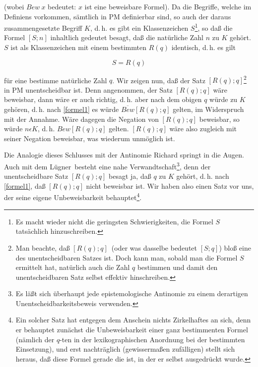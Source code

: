 \documentclass[draft]{scrartcl}
\begin{document}
(wobei $Bew\ x$ bedeutet: $x$ ist eine beweisbare Formel).
Da die Begriffe, welche im Definiens vorkommen, sämtlich
in PM definierbar sind, so auch der daraus zusammengesetzte
Begriff $K$, d.\,h. es gibt ein Klassenzeichen 
$S$\footnote{Es macht wieder nicht die geringsten Schwierigkeiten, die Formel $S$ tatsächlich hinzuschreiben.},
so daß die Formel $\left[S; n\right]$ inhaltlich gedeutet besagt,
daß die natürliche Zahl $n$ zu $K$ gehört. $S$ ist als
Klassenzeichen mit einem bestimmten $R\left(q\right)$ identisch, 
d.\,h. es gilt

$$ S = R\left(q\right) $$%

\noindent für eine bestimme natürliche Zahl $q$. Wir zeigen nun, daß
der Satz $\left[R\left(q\right); q\right]$\footnote{Man beachte, daß
\glqq$\left[R\left(q\right); q\right]$\grqq\ (oder was dasselbe bedeutet
\glqq$\left[S; q\right]$\grqq) bloß eine  
des unentscheidbaren Satzes ist. Doch kann man, sobald man die Formel 
$S$ ermittelt hat, natürlich auch die Zahl $q$ bestimmen und damit 
den unentscheidbaren Satz selbst effektiv hinschreiben.} 
in PM unentscheidbar ist. Denn angenommen, der Satz
$\left[R\left(q\right); q\right]$ wäre beweisbar, dann wäre er auch richtig,
d.\,h. aber nach dem obigen $q$ würde zu $K$ gehören,
d.\,h. nach \ref{formel1} es würde 
$\overline{Bew}\left[R\left(q\right); q\right]$ gelten, im Widerspruch mit der
Annahme. Wäre dagegen die Negation von
$\left[R\left(q\right); q\right]$ beweisbar, so würde $n \epsilon K$,
d.\,h. $Bew\left[R\left(q\right); q\right]$ gelten. $\left[R\left(q\right); q\right]$ wäre also 
zugleich mit seiner Negation beweisbar, was wiederum 
unmöglich ist.

Die Analogie dieses Schlusses mit der Antinomie Richard
springt in die Augen. Auch mit dem 
\glqq Lügner\grqq\ besteht eine nahe 
Verwandtschaft\footnote{Es läßt sich überhaupt jede epistemologische 
Antinomie zu einem derartigen Unentscheidbarkeitsbeweis verwenden.},
denn der unentscheidbare Satz $\left[R\left(q\right); q\right]$ besagt ja,
daß $q$ zu $K$ gehört, d.\,h. nach \ref{formel1},
daß $\left[R\left(q\right); q\right]$ nicht beweisbar ist. Wir haben
also einen Satz vor uns, der seine eigene
Unbeweisbarkeit behauptet\footnote{\label{zufaellig}Ein solcher Satz
hat entgegen dem Anschein nichts Zirkelhaftes an sich, denn 
er behauptet zunächst die Unbeweisbarkeit einer ganz bestimmenten 
Formel (nämlich der $q$-ten in der lexikographischen Anordnung
bei der bestimmten Einsetzung), und erst nachträglich (gewissermaßen
zufälligen) stellt sich heraus, daß diese Formel gerade
die ist, in der er selbst ausgedrückt wurde.}.
\end{document}
